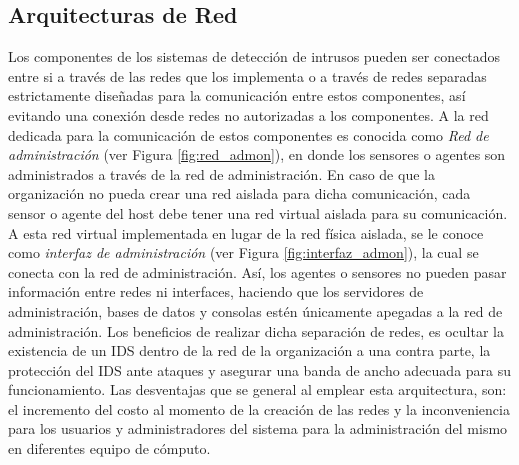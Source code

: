 \subsection{Arquitecturas de Red}

Los componentes de los sistemas de detección de intrusos pueden ser conectados entre si a través de las redes que los implementa o a través de redes separadas estrictamente diseñadas para la comunicación entre estos componentes, así evitando una conexión desde redes no autorizadas a los componentes. A la red dedicada para la comunicación de estos componentes es conocida como \textit{Red de administración} (ver Figura \ref{fig:red_admon}), en donde los sensores o agentes son administrados a través de la red de administración. En caso de que la organización no pueda crear una red aislada para dicha comunicación, cada sensor o agente del host debe tener una red virtual aislada para su comunicación. A esta red virtual implementada en lugar de la red física aislada, se le conoce como \textit{interfaz de administración} (ver Figura \ref{fig:interfaz_admon}), la cual se conecta con la red de administración. Así, los agentes o sensores no pueden pasar información entre redes ni interfaces, haciendo que los servidores de administración, bases de datos y consolas estén únicamente apegadas a la red de administración. Los beneficios de realizar dicha separación de redes, es ocultar la existencia de un IDS dentro de la red de la organización a una contra parte, la protección del IDS ante ataques y asegurar una banda de ancho adecuada para su funcionamiento. Las desventajas que se general al emplear esta arquitectura, son: el incremento del costo al momento de la creación de las redes y la inconveniencia para los usuarios y administradores del sistema para la administración del mismo en diferentes equipo de cómputo.
	
